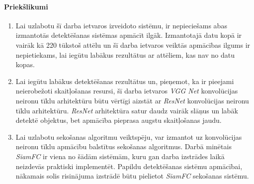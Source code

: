 \paragraph{Priekšlikumi}
\hfill\par
\begin{enumerate}
	\item Lai uzlabotu šī darba ietvaros izveidoto sistēmu, ir nepieciešams abas izmantotās detektēšanas sistēmas apmācīt ilgāk. Izmantotajā datu kopā ir vairāk kā 220 tūkstoš attēlu un šī darba ietvaros veiktās apmācības ilgums ir nepietiekams, lai iegūtu labākus rezultātus ar attēliem, kas nav no datu kopas.
	\item Lai iegūtu labākus detektēšanas rezultātus un, pieņemot, ka ir pieejami neierobežoti skaitļošanas resursi, šī darba ietvaros \textit{VGG Net} konvolūcijas neironu tīklu arhitektūru būtu vērtīgi aizstāt ar \textit{ResNet} konvolūcijas neironu tīklu arhitektūru. \textit{ResNet} arhitektūra satur daudz vairāk slāņus un labāk detektē objektus, bet apmācība pieprasa augstu skaitļošanas jaudu. 
	\item Lai uzlabotu sekošanas algoritmu veiktspēju, var izmantot uz konvolūcijas neironu tīklu apmācību balstītus sekošanas algoritmus. Darbā minētais \textit{SiamFC} ir viena no šādām sistēmām, kuru gan darba izstrādes laikā neizdevās praktiski implementēt. Papildu detektēšanas sistēmu apmācībai, nākamais solis risinājuma izstrādē būtu pielietot \textit{SiamFC} sekošanas sistēmu. 
\end{enumerate}